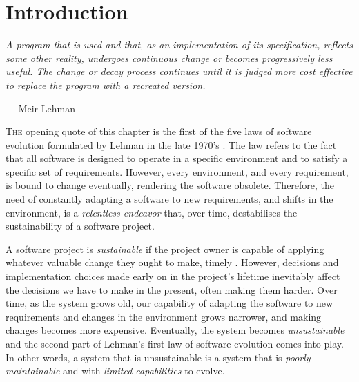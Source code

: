 \chapter{Introduction}\label{chap:introduction}

\epigraph{\emph{A program that is used and that, as an implementation of its specification, reflects some other reality, undergoes continuous change or becomes progressively less useful.
The change or decay process continues until it is judged more cost effective to replace the program with a recreated version.}}{--- Meir Lehman}

\lettrine{T}{he} opening quote of this chapter is the first of the five laws of software evolution formulated by Lehman in the late 1970's \cite{Lehman1979}.
The law refers to the fact that all software is designed to operate in a specific environment and to satisfy a specific set of requirements. 
However, every environment, and every requirement, is bound to change eventually, rendering the software obsolete. %
Therefore, the need of constantly adapting a software to new requirements, and shifts in the environment, is a \emph{relentless endeavor} that, over time, destabilises the sustainability of a software project.

A software project is \emph{sustainable} if the project owner is capable of applying whatever valuable change they ought to make, timely \cite{Winters2020}.
However, decisions and implementation choices made early on in the project's lifetime inevitably affect the decisions we have to make in the present, often making them harder.
Over time, as the system grows old, our capability of adapting the software to new requirements and changes in the environment grows narrower, and making changes becomes more expensive.
Eventually, the system becomes \emph{unsustainable} and the second part of Lehman's first law of software evolution comes into play.
In other words, a system that is unsustainable is a system that is \emph{poorly maintainable} and with \emph{limited capabilities} to evolve. 

